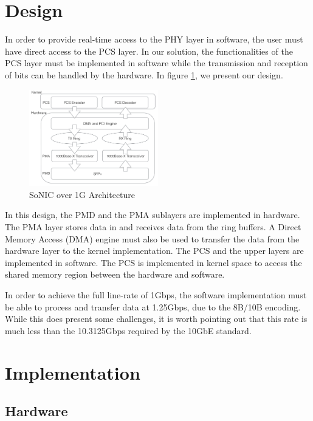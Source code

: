 \documentclass[conference]{IEEEtran}
\begin{document}
\section{Design}

In order to provide real-time access to the PHY layer in software, the user must have direct access to the PCS layer. In our solution, the functionalities of the PCS layer must be implemented in software while the transmission and reception of bits can be handled by the hardware. In figure \ref{fig:design}, we present our design.

\begin{figure}[h]
  \centering
  \includegraphics[width=0.5\textwidth]{images/design.pdf}
  \caption{SoNIC over 1G Architecture}
  \label{fig:design}
\end{figure}

In this design, the PMD and the PMA sublayers are implemented in hardware. The PMA layer stores data in and receives data from the ring buffers. A Direct Memory Access (DMA) engine must also be used to transfer the data from the hardware layer to the kernel implementation. The PCS and the upper layers are implemented in software. The PCS is implemented in kernel space to access the shared memory region between the hardware and software.

In order to achieve the full line-rate of 1Gbps, the software implementation must be able to process and transfer data at 1.25Gbps, due to the 8B/10B encoding. While this does present some challenges, it is worth pointing out that this rate is much less than the 10.3125Gbps required by the 10GbE standard.

\section{Implementation}

\subsection{Hardware}
\end{document}
